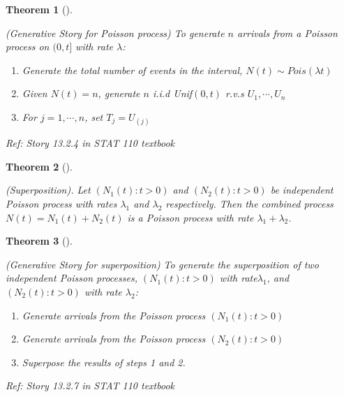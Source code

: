\documentclass[
  letterpaper,
  DIV=11,
  numbers=noendperiod]{scrreprt}
\theoremstyle{definition}
\theoremstyle{plain}
\newtheorem{theorem}{Theorem}[chapter]
\theoremstyle{remark}
\begin{document}
\leavevmode{}%
\begin{theorem}[]\label{thm-poisson-story}

(Generative Story for Poisson process) To generate \(n\) arrivals from a
Poisson process on \((0, t]\) with rate \(\lambda\):

\begin{enumerate}
\def\labelenumi{\arabic{enumi}.}
\item
  Generate the total number of events in the interval,
  \(N(t) \sim Pois(\lambda t)\)
\item
  Given \(N(t) = n\), generate \(n\) i.i.d Unif\((0,t)\) r.v.s
  \(U_1, \cdots, U_n\)
\item
  For \(j=1, \cdots, n\), set \(T_j = U_{(j)}\)
\end{enumerate}

\emph{Ref: Story 13.2.4 in STAT 110 textbook}

\end{theorem}

\leavevmode{}%
\begin{theorem}[]\label{thm-superposition}

(Superposition). Let \((N_1(t): t>0)\) and \((N_2(t): t>0)\) be
independent Poisson process with rates \(\lambda_1\) and \(\lambda_2\)
respectively. Then the combined process \(N(t) = N_1(t) + N_2(t)\) is a
Poisson process with rate \(\lambda_1+\lambda_2\).

\end{theorem}

\leavevmode{}%
\begin{theorem}[]\label{thm-poisson-story-superposition}

(Generative Story for superposition) To generate the superposition of
two independent Poisson processes, \((N_1(t): t>0)\) with
rate\(\lambda_1\), and \((N_2(t): t>0)\) with rate \(\lambda_2\):

\begin{enumerate}
\def\labelenumi{\arabic{enumi}.}
\item
  Generate arrivals from the Poisson process \((N_1(t): t>0)\)
\item
  Generate arrivals from the Poisson process \((N_2(t): t>0)\)
\item
  Superpose the results of steps 1 and 2.
\end{enumerate}

\emph{Ref: Story 13.2.7 in STAT 110 textbook}

\end{theorem}
\end{document}
